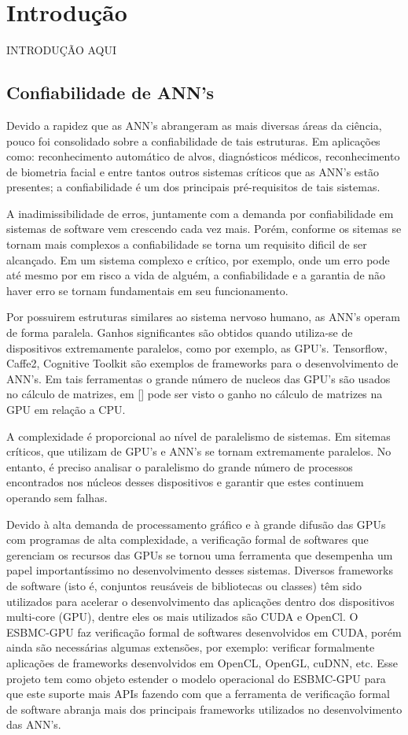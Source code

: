
\chapter{Introdução} %
INTRODUÇÃO AQUI
\section{Confiabilidade de ANN's}
 Devido a rapidez que as ANN's abrangeram as mais diversas áreas da ciência, pouco foi consolidado sobre a confiabilidade de tais estruturas. Em aplicações como: reconhecimento automático de alvos, diagnósticos médicos, reconhecimento de biometria facial e entre tantos outros sistemas críticos que as ANN's estão presentes; a confiabilidade é um dos principais pré-requisitos de tais sistemas.
 
 A inadimissibilidade de erros, juntamente com a demanda por confiabilidade em sistemas de software vem crescendo cada vez mais. Porém, conforme os sitemas se tornam mais complexos a confiabilidade se torna um requisito dificil de ser alcançado. Em um sistema complexo e crítico, por exemplo, onde um erro pode até mesmo por em risco a vida de alguém, a confiabilidade e a garantia de não haver erro se tornam fundamentais em seu funcionamento. 
 
 Por possuirem estruturas similares ao sistema nervoso humano, as ANN's operam de forma paralela. Ganhos significantes são obtidos quando utiliza-se de dispositivos extremamente paralelos, como por exemplo, as GPU's. Tensorflow, Caffe2, Cognitive Toolkit são exemplos de frameworks para o desenvolvimento de ANN's. Em tais ferramentas o grande número de nucleos das GPU's são usados no cálculo de matrizes, em [] pode ser visto o ganho no cálculo de matrizes na GPU em relação a CPU.
 
 A complexidade é proporcional ao nível de paralelismo de sistemas. Em sitemas críticos, que utilizam de GPU's e ANN's se tornam extremamente paralelos. No entanto, é preciso analisar o paralelismo do grande número de processos encontrados nos núcleos desses dispositivos e garantir que estes continuem operando sem falhas.
 
 Devido à alta demanda de processamento gráfico e à grande difusão das GPUs com programas de alta complexidade, a verificação formal de softwares que gerenciam os recursos das GPUs se tornou uma ferramenta que desempenha um papel importantíssimo no desenvolvimento desses sistemas. Diversos frameworks de software (isto é, conjuntos reusáveis de bibliotecas ou classes) têm sido utilizados para acelerar o desenvolvimento das aplicações dentro dos dispositivos multi-core (GPU), dentre eles os mais utilizados são CUDA e OpenCl. O ESBMC-GPU faz verificação formal de softwares desenvolvidos em CUDA, porém ainda são necessárias algumas extensões, por exemplo: verificar formalmente aplicações de frameworks desenvolvidos em OpenCL, OpenGL, cuDNN, etc. Esse projeto tem como objeto estender o modelo operacional do ESBMC-GPU para que este suporte mais APIs fazendo com que a ferramenta de verificação formal de software abranja mais dos principais frameworks utilizados no desenvolvimento das ANN's.
 
